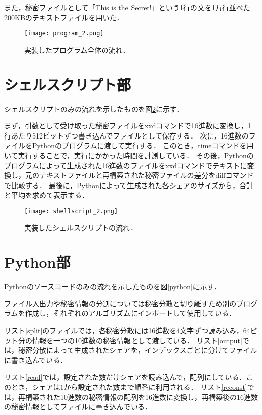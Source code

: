 \documentclass[10pt, a4paper, titlepage]{jsreport}
\begin{document}
	また，秘密ファイルとして「This is the Secret!」という1行の文を1万行並べた200KBのテキストファイルを用いた．

	\begin{figure}[ht]
		\begin{center}
			\texttt{[image: program\_2.png]}
			\caption{実装したプログラム全体の流れ．}
			\label{program}
		\end{center}
	\end{figure}

	\section{シェルスクリプト部}
	シェルスクリプトのみの流れを示したものを図\ref{shellscript}に示す．

	まず，引数として受け取った秘密ファイルをxxdコマンドで16進数に変換し，1行あたり512ビットずつ書き込んでファイルとして保存する．
	次に，16進数のファイルをPythonのプログラムに渡して実行する．
	このとき，timeコマンドを用いて実行することで，実行にかかった時間を計測している．
	その後，Pythonのプログラムによって生成された16進数のファイルをxxdコマンドでテキストに変換し，元のテキストファイルと再構築された秘密ファイルの差分をdiffコマンドで比較する．
	最後に，Pythonによって生成された各シェアのサイズから，合計と平均を求めて表示する．

	\begin{figure}[ht]
		\begin{center}
			\texttt{[image: shellscript\_2.png]}
			\caption{実装したシェルスクリプトの流れ．}
			\label{shellscript}
		\end{center}
	\end{figure}

	\section{Python部}
	Pythonのソースコードのみの流れを示したものを図\ref{python}に示す．

	ファイル入出力や秘密情報の分割については秘密分散と切り離すため別のプログラムを作成し，それぞれのアルゴリズムにインポートして使用している．

	リスト\ref{split}のファイルでは，各秘密分散には16進数を4文字ずつ読み込み，64ビット分の情報を一つの10進数の秘密情報として渡している．
	リスト\ref{output}では，秘密分散によって生成されたシェアを，インデックスごとに分けてファイルに書き込んでいる．

	リスト\ref{read}では，設定された数だけシェアを読み込んで，配列にしている．このとき，シェアは$1$から設定された数まで順番に利用される．
	リスト\ref{reconst}では，再構築された10進数の秘密情報の配列を16進数に変換し，再構築後の16進数の秘密情報としてファイルに書き込んでいる．
\end{document}
